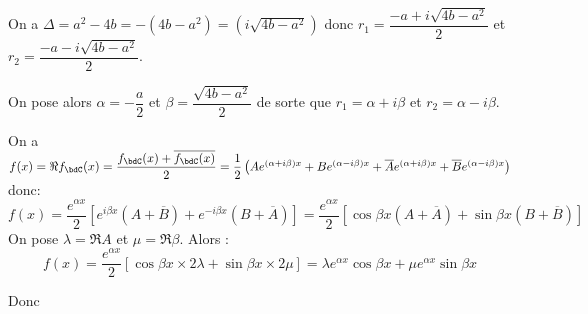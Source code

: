 \documentclass[a4paper,french,bookmarks]{article}
\begin{document}
\begin{enumerate}
{    On a $\Delta = a^2 - 4b = -(4b - a^2) = \left(i\sqrt{4b - a^2}\right)$ donc $r_1 = \dfrac{-a+i\sqrt{4b - a^2}}{2}$ et $r_2 = \dfrac{-a-i\sqrt{4b - a^2}}{2}$.
    
    On pose alors $\alpha = -\dfrac{a}{2}$ et $\beta = \dfrac{\sqrt{4b - a^2}}{2}$ de sorte que $r_1 = \alpha + i\beta$ et $r_2 = \alpha - i\beta$.
    
    On a $f(x) = \Re{f_\bdC(x)} = \dfrac{f_\bdC(x) + \overline{f_\bdC(x)}}{2} = \dfrac{1}{2}\left(Ae^{(\alpha+i\beta)x}+Be^{(\alpha-i\beta)x}+\overline Ae^{(\alpha+i\beta)x}+\overline Be^{(\alpha-i\beta)x}\right)$ donc:
    \[ f(x) = \dfrac{e^{\alpha x}}{2}\left[e^{i\beta x}(A+\overline{B}) + e^{-i\beta x}(B + \overline A)\right] =\dfrac{e^{\alpha x}}{2}\left[\cos{\beta x}(A + \overline{A}) + \sin{\beta x}(B + \overline B)\right] \]
    On pose $\lambda = \Re{A}$ et $\mu = \Re{\beta}$. Alors :
    \[ f(x) = \dfrac{e^{\alpha x}}{2}\left[\cos{\beta x}\times 2\lambda + \sin{\beta x}\times 2\mu \right] = \lambda e^{\alpha x}\cos{\beta x} + \mu e^{\alpha x}\sin{\beta x}\]
    
    Donc 
     }
    
\end{enumerate}
\end{document}
